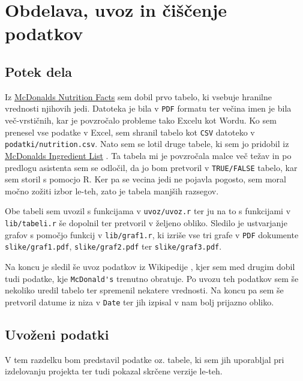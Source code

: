 \documentclass[hidelinks, 11pt,a4paper]{article}
\begin{document}
\section{Obdelava, uvoz in čiščenje podatkov}

\subsection{Potek dela}

Iz \href{http://nutrition.mcdonalds.com/getnutrition/nutritionfacts.pdf}{McDonalds Nutrition Facts} \cite{bib:NutrFacts} sem dobil prvo tabelo, ki vsebuje hranilne vrednosti njihovih jedi. Datoteka je bila v \verb|PDF| formatu ter večina imen je bila več-vrstičnih, kar je povzročalo probleme tako Excelu kot Wordu. Ko sem prenesel vse podatke v Excel, sem shranil tabelo kot \verb|CSV| datoteko v \verb|podatki/nutrition.csv|. Nato sem se lotil druge tabele, ki sem jo pridobil iz \href{http://nutrition.mcdonalds.com/getnutrition/ingredientslist.pdf}{McDonalds Ingredient List} \cite{bib:IngrList}. Ta tabela mi je povzročala malce več težav in po predlogu asistenta sem se odločil, da jo bom pretvoril v \verb|TRUE/FALSE| tabelo, kar sem storil s pomocjo R. Ker pa se vecina jedi ne pojavla pogosto, sem moral močno zožiti izbor le-teh, zato je tabela manjših razsegov. \par

Obe tabeli sem uvozil s funkcijama v \verb|uvoz/uvoz.r| ter ju na to s funkcijami v \verb|lib/tabeli.r| še dopolnil ter pretvoril v željeno obliko. Sledilo je ustvarjanje grafov s pomočjo funkcij v \verb|lib/graf1.r|, ki izriše vse tri grafe v \verb|PDF| dokumente \verb|slike/graf1.pdf|, \verb|slike/graf2.pdf| ter \verb|slike/graf3.pdf|. \par

Na koncu je sledil še uvoz podatkov iz Wikipedije \cite{bib:drzave}, kjer sem med drugim dobil tudi podatke, kje \verb|McDonald's| trenutno obratuje. Po uvozu teh podatkov sem še nekoliko uredil tabelo ter spremenil nekatere vrednosti. Na koncu pa sem še pretvoril datume iz niza v \verb|Date| ter jih izpisal v nam bolj prijazno obliko.

\subsection{Uvoženi podatki}

V tem razdelku bom predstavil podatke oz. tabele, ki sem jih uporabljal pri izdelovanju projekta ter tudi pokazal skrčene verzije le-teh.
\end{document}
